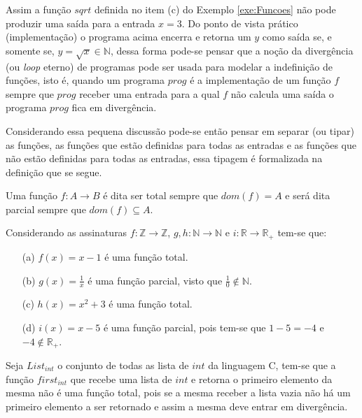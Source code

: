 Assim a função $sqrt$ definida no item (c) do Exemplo \ref{exe:Funcoes} não pode produzir uma saída para a entrada $x = 3$. Do ponto de vista prático (implementação) o programa acima encerra e retorna um $y$ como saída se, e somente se,  $y = \sqrt{x} \in \mathbb{N}$, dessa forma pode-se pensar que a noção da divergência (ou \textit{loop} eterno) de programas pode ser usada para modelar a indefinição de funções, isto é, quando um programa $prog$ é a implementação de um função $f$ sempre que $prog$ receber uma entrada para a qual $f$ não calcula uma saída o programa $prog$ fica em divergência.

Considerando essa pequena discussão pode-se então pensar em separar (ou tipar) as funções, as funções que estão definidas para todas as entradas e as funções que não estão definidas para todas as entradas, essa tipagem é formalizada na definição que se segue.

\begin{definition}
	Uma função $f: A \rightarrow B$ é dita ser total sempre que $dom(f) = A$ e será dita parcial sempre que $dom(f) \subseteq A$.
\end{definition}

\begin{example}\label{exem:FuncoesTotaisParciais1}
	Considerando as assinaturas $f: \mathbb{Z} \rightarrow \mathbb{Z}$, $g, h: \mathbb{N} \rightarrow \mathbb{N}$ e $i: \mathbb{R} \rightarrow \mathbb{R}_+$ tem-se que:
	\begin{itemize}
		\item[(a)] $f(x) = x - 1$ é uma função total. 
		\item[(b)] $g(x) = \frac{1}{x}$ é uma função parcial, visto que $\frac{1}{0} \notin \mathbb{N}$.
		\item[(c)] $h(x) = x^2 + 3$ é uma função total.
		\item[(d)] $i(x) = x - 5$ é uma função parcial, pois tem-se que $1 - 5 = -4$ e $-4 \notin \mathbb{R}_+$.
	\end{itemize}
\end{example}

\begin{example}\label{exem:FuncoesTotaisParciais2}
	Seja $List_{int}$ o conjunto de todas as lista de $int$ da linguagem C, tem-se que a função $first_{int}$ que recebe uma lista de $int$ e retorna o primeiro elemento da mesma não é uma função total, pois se a mesma receber a lista vazia não há um primeiro elemento a ser retornado e assim a mesma deve entrar em divergência.
\end{example}

